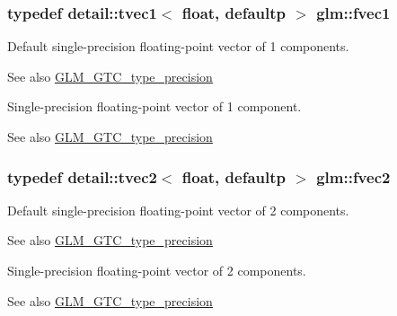 \subsubsection[{\texorpdfstring{fvec1}{fvec1}}]{\setlength{\rightskip}{0pt plus 5cm}typedef detail\+::tvec1$<$ float, defaultp $>$ {\bf glm\+::fvec1}}\hypertarget{group__gtc__type__precision_gab927d62f22fa57461367011950cec650}{}\label{group__gtc__type__precision_gab927d62f22fa57461367011950cec650}
Default single-\/precision floating-\/point vector of 1 components. \begin{DoxySeeAlso}{See also}
\hyperlink{group__gtc__type__precision}{G\+L\+M\+\_\+\+G\+T\+C\+\_\+type\+\_\+precision}
\end{DoxySeeAlso}
Single-\/precision floating-\/point vector of 1 component. \begin{DoxySeeAlso}{See also}
\hyperlink{group__gtc__type__precision}{G\+L\+M\+\_\+\+G\+T\+C\+\_\+type\+\_\+precision} 
\end{DoxySeeAlso}
\subsubsection[{\texorpdfstring{fvec2}{fvec2}}]{\setlength{\rightskip}{0pt plus 5cm}typedef detail\+::tvec2$<$ float, defaultp $>$ {\bf glm\+::fvec2}}\hypertarget{group__gtc__type__precision_gaafd518792a4646c7bb60aabc62a4684c}{}\label{group__gtc__type__precision_gaafd518792a4646c7bb60aabc62a4684c}
Default single-\/precision floating-\/point vector of 2 components. \begin{DoxySeeAlso}{See also}
\hyperlink{group__gtc__type__precision}{G\+L\+M\+\_\+\+G\+T\+C\+\_\+type\+\_\+precision}
\end{DoxySeeAlso}
Single-\/precision floating-\/point vector of 2 components. \begin{DoxySeeAlso}{See also}
\hyperlink{group__gtc__type__precision}{G\+L\+M\+\_\+\+G\+T\+C\+\_\+type\+\_\+precision} 
\end{DoxySeeAlso}
